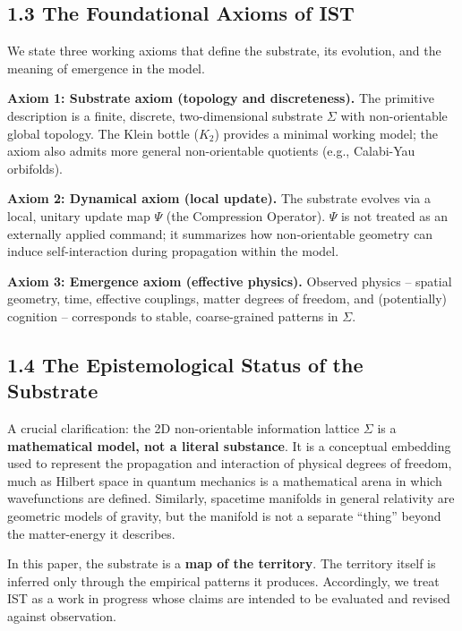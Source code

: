 \documentclass[
  11pt,
]{article}
\begin{document}
\subsection{1.3 The Foundational Axioms of
IST}\label{the-foundational-axioms-of-ist}

We state three working axioms that define the substrate, its evolution,
and the meaning of emergence in the model.

\textbf{Axiom 1: Substrate axiom (topology and discreteness).} The
primitive description is a finite, discrete, two-dimensional substrate
\(\Sigma\) with non-orientable global topology. The Klein bottle
(\(K_2\)) provides a minimal working model; the axiom also admits more
general non-orientable quotients (e.g., Calabi-Yau orbifolds).

\textbf{Axiom 2: Dynamical axiom (local update).} The substrate evolves
via a local, unitary update map \(\Psi\) (the Compression Operator).
\(\Psi\) is not treated as an externally applied command; it summarizes
how non-orientable geometry can induce self-interaction during
propagation within the model.

\textbf{Axiom 3: Emergence axiom (effective physics).} Observed physics
-- spatial geometry, time, effective couplings, matter degrees of
freedom, and (potentially) cognition -- corresponds to stable,
coarse-grained patterns in \(\Sigma\).

\subsection{1.4 The Epistemological Status of the
Substrate}\label{the-epistemological-status-of-the-substrate}

A crucial clarification: the 2D non-orientable information lattice
\(\Sigma\) is a \textbf{mathematical model, not a literal substance}. It
is a conceptual embedding used to represent the propagation and
interaction of physical degrees of freedom, much as Hilbert space in
quantum mechanics is a mathematical arena in which wavefunctions are
defined. Similarly, spacetime manifolds in general relativity are
geometric models of gravity, but the manifold is not a separate
``thing'' beyond the matter-energy it describes.

In this paper, the substrate is a \textbf{map of the territory}. The
territory itself is inferred only through the empirical patterns it
produces. Accordingly, we treat IST as a work in progress whose claims
are intended to be evaluated and revised against observation.
\end{document}
